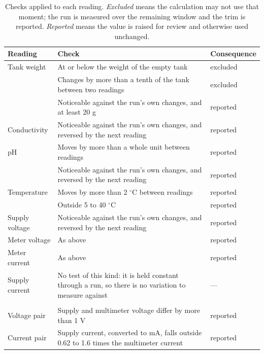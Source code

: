 \documentclass[11pt,a4paper]{article}
\begin{document}
\begin{table}[htbp]
\centering
\footnotesize
\caption{Checks applied to each reading. \emph{Excluded} means the calculation may not use
that moment; the run is measured over the remaining window and the trim is reported.
\emph{Reported} means the value is raised for review and otherwise used unchanged.}
\label{tab:checks}
\begin{tabular}{@{}l p{8.8cm} l@{}}
\toprule
Reading & Check & Consequence \\
\midrule
Tank weight & At or below the weight of the empty tank & excluded \\
            & Changes by more than a tenth of the tank between two readings & excluded \\
            & Noticeable against the run's own changes, and at least 20 g & reported \\
\addlinespace
Conductivity & Noticeable against the run's own changes, and reversed by the next reading &
reported \\
\addlinespace
pH & Moves by more than a whole unit between readings & reported \\
   & Noticeable against the run's own changes, and reversed by the next reading & reported \\
\addlinespace
Temperature & Moves by more than 2 $^{\circ}$C between readings & reported \\
            & Outside 5 to 40 $^{\circ}$C & reported \\
\addlinespace
Supply voltage & Noticeable against the run's own changes, and reversed by the next reading &
reported \\
Meter voltage & As above & reported \\
Meter current & As above & reported \\
Supply current & No test of this kind: it is held constant through a run, so there is no
variation to measure against & --- \\
\addlinespace
\multicolumn{3}{@{}l}{\emph{Comparisons between the two instruments, which need no statistics:}} \\
Voltage pair & Supply and multimeter voltage differ by more than 1 V & reported \\
Current pair & Supply current, converted to mA, falls outside 0.62 to 1.6 times the
multimeter current & reported \\
\bottomrule
\end{tabular}
\end{table}
\end{document}
